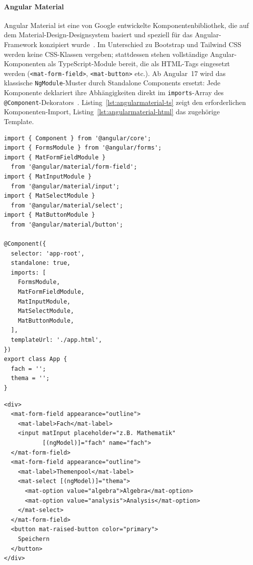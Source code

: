\paragraph{Angular Material}

Angular Material ist eine von Google entwickelte Komponentenbibliothek,
die auf dem Material-Design-Designsystem basiert und speziell für das
Angular-Framework konzipiert wurde~\cite{angularmaterial2023docs}.
Im Unterschied zu Bootstrap und Tailwind CSS werden keine CSS-Klassen
vergeben; stattdessen stehen vollständige Angular-Komponenten als
TypeScript-Module bereit, die als HTML-Tags eingesetzt werden
(\texttt{<mat-form-field>}, \texttt{<mat-button>} etc.).
Ab Angular~17 wird das klassische \texttt{NgModule}-Muster durch
Standalone Components ersetzt: Jede Komponente deklariert ihre
Abhängigkeiten direkt im \texttt{imports}-Array des
\texttt{@Component}-Dekorators~\cite{angularmaterial2023docs}.
Listing~\ref{lst:angularmaterial-ts} zeigt den erforderlichen
Komponenten-Import, Listing~\ref{lst:angularmaterial-html} das zugehörige
Template.

\begin{lstlisting}[style=tsstyle,
                   caption={Standalone Component mit Angular Material (app.ts)},
                   label={lst:angularmaterial-ts}]
import { Component } from '@angular/core';
import { FormsModule } from '@angular/forms';
import { MatFormFieldModule }
  from '@angular/material/form-field';
import { MatInputModule }
  from '@angular/material/input';
import { MatSelectModule }
  from '@angular/material/select';
import { MatButtonModule }
  from '@angular/material/button';

@Component({
  selector: 'app-root',
  standalone: true,
  imports: [
    FormsModule,
    MatFormFieldModule,
    MatInputModule,
    MatSelectModule,
    MatButtonModule,
  ],
  templateUrl: './app.html',
})
export class App {
  fach = '';
  thema = '';
}
\end{lstlisting}

\begin{lstlisting}[style=htmlstyle,
                   caption={Eingabeformular mit Angular Material},
                   label={lst:angularmaterial-html}]
<div>
  <mat-form-field appearance="outline">
    <mat-label>Fach</mat-label>
    <input matInput placeholder="z.B. Mathematik"
           [(ngModel)]="fach" name="fach">
  </mat-form-field>
  <mat-form-field appearance="outline">
    <mat-label>Themenpool</mat-label>
    <mat-select [(ngModel)]="thema">
      <mat-option value="algebra">Algebra</mat-option>
      <mat-option value="analysis">Analysis</mat-option>
    </mat-select>
  </mat-form-field>
  <button mat-raised-button color="primary">
    Speichern
  </button>
</div>
\end{lstlisting}


